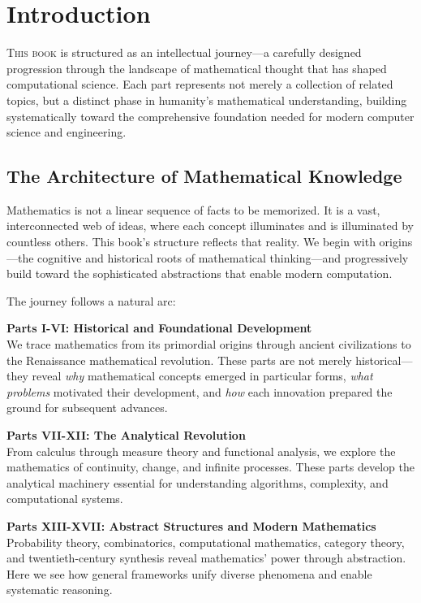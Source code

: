 \chapter*{Introduction}

\lettrine{T}{his book} is structured as an intellectual journey—a carefully designed progression through the landscape of mathematical thought that has shaped computational science. Each part represents not merely a collection of related topics, but a distinct phase in humanity's mathematical understanding, building systematically toward the comprehensive foundation needed for modern computer science and engineering.

\section*{The Architecture of Mathematical Knowledge}

Mathematics is not a linear sequence of facts to be memorized. It is a vast, interconnected web of ideas, where each concept illuminates and is illuminated by countless others. This book's structure reflects that reality. We begin with origins—the cognitive and historical roots of mathematical thinking—and progressively build toward the sophisticated abstractions that enable modern computation.

The journey follows a natural arc:

\textbf{Parts I-VI: Historical and Foundational Development}\\
We trace mathematics from its primordial origins through ancient civilizations to the Renaissance mathematical revolution. These parts are not merely historical—they reveal \textit{why} mathematical concepts emerged in particular forms, \textit{what problems} motivated their development, and \textit{how} each innovation prepared the ground for subsequent advances.

\textbf{Parts VII-XII: The Analytical Revolution}\\
From calculus through measure theory and functional analysis, we explore the mathematics of continuity, change, and infinite processes. These parts develop the analytical machinery essential for understanding algorithms, complexity, and computational systems.

\textbf{Parts XIII-XVII: Abstract Structures and Modern Mathematics}\\
Probability theory, combinatorics, computational mathematics, category theory, and twentieth-century synthesis reveal mathematics' power through abstraction. Here we see how general frameworks unify diverse phenomena and enable systematic reasoning.

